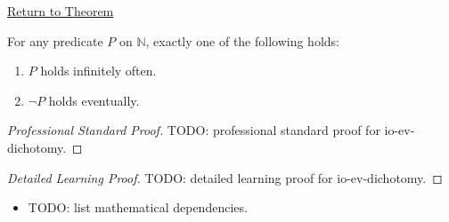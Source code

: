 \newpage
{}
\label{prf:io-ev-dichotomy}

\begin{remark*}[Return]
\hyperref[prop:io-ev-dichotomy]{Return to Theorem}
\end{remark*}

\begin{proposition*}
For any predicate $P$ on $\mathbb{N}$, exactly one of the following holds:
\begin{enumerate}[label=(\roman*)]
  \item $P$ holds infinitely often.
  \item $\neg P$ holds eventually.
\end{enumerate}
\end{proposition*}

\begin{proof}[Professional Standard Proof]
\LRAProofBodyStart
TODO: professional standard proof for io-ev-dichotomy.
\end{proof}

\begin{proof}[Detailed Learning Proof]
\LRAProofBodyStart
TODO: detailed learning proof for io-ev-dichotomy.
\end{proof}

\begin{remark*}
\end{remark*}

\begin{dependencies}
\begin{itemize}
  \item TODO: list mathematical dependencies.
\end{itemize}
\end{dependencies}

\clearpage
